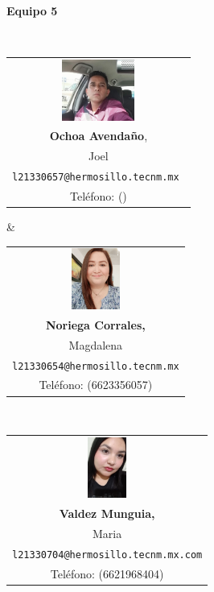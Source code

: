 \begin{titlepage}
	\begin{center}
		{\Large \textbf{Equipo 5}}
	\end{center}
	
	\vspace{1em}
	
	\begin{center}
		\
			\begin{tabular}{c}
				\includegraphics[height=2cm]{portada/joel.jpg} \\
				\textbf{Ochoa Avendaño},\\ Joel \\ \texttt{l21330657@hermosillo.tecnm.mx } \\ Teléfono: ()
			\end{tabular} &
			\begin{tabular}{c}
				\includegraphics[height=2cm]{portada/Magda.jpg} \\
				\textbf{Noriega Corrales,}\\ Magdalena \\ \texttt{l21330654@hermosillo.tecnm.mx} \\ Teléfono: (6623356057)
			\end{tabular} \\ \vspace{2em}
			\begin{tabular}{c}
				\includegraphics[height=2cm]{portada/maria fernanda.jpg} \\
				\textbf{Valdez Munguia,}\\ Maria  \\ \texttt{l21330704@hermosillo.tecnm.mx.com} \\ Teléfono: (6621968404)

\end{tabular}
\end{center}
\end{titlepage}
